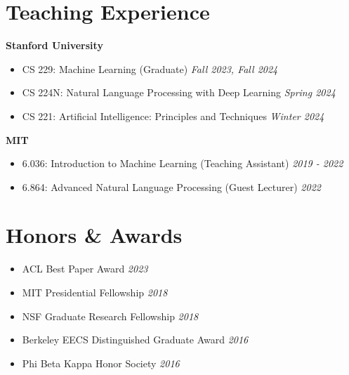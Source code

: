 \documentclass[11pt]{article}
\begin{document}
\vspace{0.2cm}

\section*{Teaching Experience}

\textbf{Stanford University}
\begin{itemize}[leftmargin=*, itemsep=2pt]
    \item CS 229: Machine Learning (Graduate) \hfill \textit{Fall 2023, Fall 2024}
    \item CS 224N: Natural Language Processing with Deep Learning \hfill \textit{Spring 2024}
    \item CS 221: Artificial Intelligence: Principles and Techniques \hfill \textit{Winter 2024}
\end{itemize}

\vspace{0.15cm}

\textbf{MIT}
\begin{itemize}[leftmargin=*, itemsep=2pt]
    \item 6.036: Introduction to Machine Learning (Teaching Assistant) \hfill \textit{2019 - 2022}
    \item 6.864: Advanced Natural Language Processing (Guest Lecturer) \hfill \textit{2022}
\end{itemize}

\vspace{0.2cm}

\section*{Honors \& Awards}

\begin{itemize}[leftmargin=*, itemsep=2pt]
    \item ACL Best Paper Award \hfill \textit{2023}
    \item MIT Presidential Fellowship \hfill \textit{2018}
    \item NSF Graduate Research Fellowship \hfill \textit{2018}
    \item Berkeley EECS Distinguished Graduate Award \hfill \textit{2016}
    \item Phi Beta Kappa Honor Society \hfill \textit{2016}
\end{itemize}

\vspace{0.2cm}
\end{document}
